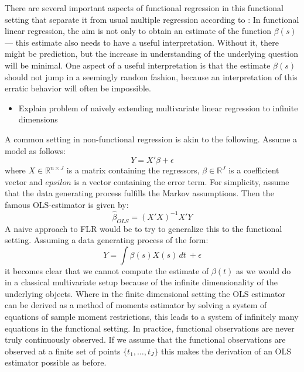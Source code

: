 \documentclass[11pt,twoside,a4paper]{article}
\begin{document}
There are several important aspects of functional regression in this functional setting that separate it from usual multiple regression according to \cite{kokoszka_introduction_2017}: In functional linear regression, the aim is not only to obtain an estimate of the function $\beta(s)$ — this estimate also needs to have a useful interpretation. Without it, there might be prediction, but the increase in understanding of the underlying question will be minimal. One aspect of a useful interpretation is that the estimate $\beta(s)$ should not jump in a seemingly random fashion, because an interpretation of this erratic behavior will often be impossible.

	\begin{itemize}
		\item Explain problem of naively extending multivariate linear regression to infinite dimensions
	\end{itemize}
	A common setting in non-functional regression is akin to the following. Assume a model as follows:
	\begin{equation}
		Y = X'\beta + \epsilon
	\end{equation}
	where $X \in \mathbb{R}^{n\times J}$ is a matrix containing the regressors, $\beta \in \mathbb{R}^J$ is a coefficient vector and $epsilon$ is a vector containing the error term. For simplicity, assume that the data generating process fulfills the Markov assumptions. Then the famous OLS-estimator is given by:
	\begin{equation}
		\hat{\beta}_{OLS} = (X'X)^{-1}X'Y
	\end{equation}
	A naive approach to FLR would be to try to generalize this to the functional setting.
	Assuming a data generating process of the form:
	\begin{equation}
     Y =  \int \beta(s)X(s) \,dt \ +\epsilon
    \end{equation}
    it becomes clear that we cannot compute the estimate of $\beta(t)$ as we would do in a classical multivariate setup because of the infinite dimensionality of the underlying objects. Where in the finite dimensional setting the OLS estimator can be derived as a method of moments estimator by solving a system of equations of sample moment restrictions, this leads to a system of infinitely many equations in the functional setting. 
    In practice, functional observations are never truly continuously observed. If we assume that the functional observations are observed at a finite set of points $\{t_1, \dots, t_J\}$ this makes the derivation of an OLS estimator possible as before.
    
\end{document}
